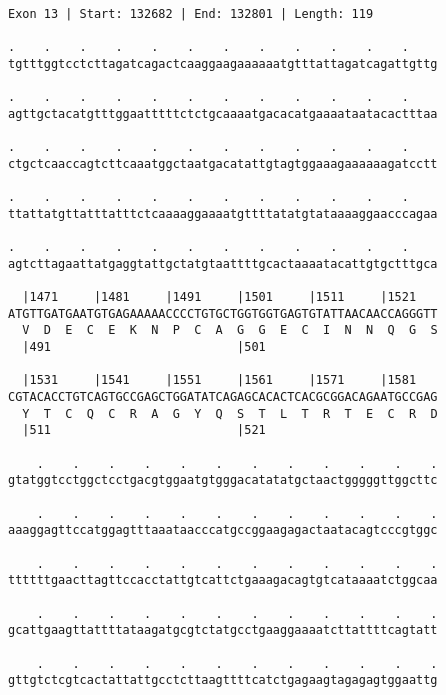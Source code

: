 \documentclass{article}
\begin{document}
\begin{Verbatim}
Exon 13 | Start: 132682 | End: 132801 | Length: 119
 
.    .    .    .    .    .    .    .    .    .    .    .    
tgtttggtcctcttagatcagactcaaggaagaaaaaatgtttattagatcagattgttg
  
.    .    .    .    .    .    .    .    .    .    .    .    
agttgctacatgtttggaatttttctctgcaaaatgacacatgaaaataatacactttaa
  
.    .    .    .    .    .    .    .    .    .    .    .    
ctgctcaaccagtcttcaaatggctaatgacatattgtagtggaaagaaaaaagatcctt
  
.    .    .    .    .    .    .    .    .    .    .    .    
ttattatgttatttatttctcaaaaggaaaatgttttatatgtataaaaggaacccagaa
  
.    .    .    .    .    .    .    .    .    .    .    .    
agtcttagaattatgaggtattgctatgtaattttgcactaaaatacattgtgctttgca
  
  |1471     |1481     |1491     |1501     |1511     |1521   
ATGTTGATGAATGTGAGAAAAACCCCTGTGCTGGTGGTGAGTGTATTAACAACCAGGGTT
  V  D  E  C  E  K  N  P  C  A  G  G  E  C  I  N  N  Q  G  S
  |491                          |501                        
  
  |1531     |1541     |1551     |1561     |1571     |1581   
CGTACACCTGTCAGTGCCGAGCTGGATATCAGAGCACACTCACGCGGACAGAATGCCGAG
  Y  T  C  Q  C  R  A  G  Y  Q  S  T  L  T  R  T  E  C  R  D
  |511                          |521                        
  
    .    .    .    .    .    .    .    .    .    .    .    .
gtatggtcctggctcctgacgtggaatgtgggacatatatgctaactgggggttggcttc
  
    .    .    .    .    .    .    .    .    .    .    .    .
aaaggagttccatggagtttaaataacccatgccggaagagactaatacagtcccgtggc
  
    .    .    .    .    .    .    .    .    .    .    .    .
ttttttgaacttagttccacctattgtcattctgaaagacagtgtcataaaatctggcaa
  
    .    .    .    .    .    .    .    .    .    .    .    .
gcattgaagttattttataagatgcgtctatgcctgaaggaaaatcttattttcagtatt
  
    .    .    .    .    .    .    .    .    .    .    .    .
gttgtctcgtcactattattgcctcttaagttttcatctgagaagtagagagtggaattg
\end{Verbatim}
\newpage
\end{document}

